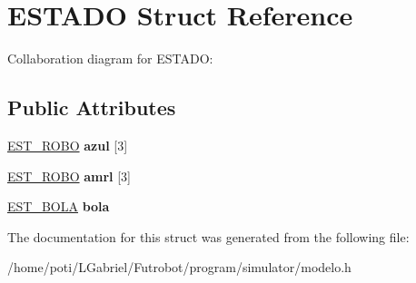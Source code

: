 \hypertarget{structESTADO}{}\section{E\+S\+T\+A\+DO Struct Reference}
\label{structESTADO}


Collaboration diagram for E\+S\+T\+A\+DO\+:
\subsection*{Public Attributes}
\begin{DoxyCompactItemize}
\item 
\hyperlink{structEST__ROBO}{E\+S\+T\+\_\+\+R\+O\+BO} {\bfseries azul} \mbox{[}3\mbox{]}\hypertarget{structESTADO_a39b9fb8a6f9e5aeffdb4f551005c5e06}{}\label{structESTADO_a39b9fb8a6f9e5aeffdb4f551005c5e06}

\item 
\hyperlink{structEST__ROBO}{E\+S\+T\+\_\+\+R\+O\+BO} {\bfseries amrl} \mbox{[}3\mbox{]}\hypertarget{structESTADO_a102176f0b80f498cec8b4be4f45e4f8f}{}\label{structESTADO_a102176f0b80f498cec8b4be4f45e4f8f}

\item 
\hyperlink{structEST__BOLA}{E\+S\+T\+\_\+\+B\+O\+LA} {\bfseries bola}\hypertarget{structESTADO_ab83046ad009914db88d9ee25bdb97ecd}{}\label{structESTADO_ab83046ad009914db88d9ee25bdb97ecd}

\end{DoxyCompactItemize}


The documentation for this struct was generated from the following file\+:\begin{DoxyCompactItemize}
\item 
/home/poti/\+L\+Gabriel/\+Futrobot/program/simulator/modelo.\+h\end{DoxyCompactItemize}
